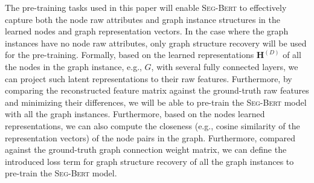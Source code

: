 \documentclass{article}
\newcommand{\mb}{\mathbf}
\newcommand{\our}{\textsc{Seg-Bert}}
\begin{document}
The pre-training tasks used in this paper will enable {\our} to effectively capture both the node raw attributes and graph instance structures in the learned nodes and graph representation vectors. In the case where the graph instances have no node raw attributes, only graph structure recovery will be used for the pre-training. Formally, based on the learned representations $\mb{H}^{(D)}$ of all the nodes in the graph instance, e.g., $G$, with several fully connected layers, we can project such latent representations to their raw features. Furthermore, by comparing the reconstructed feature matrix against the ground-truth raw features and minimizing their differences, we will be able to pre-train the {\our} model with all the graph instances. Furthermore, based on the nodes learned representations, we can also compute the closeness (e.g., cosine similarity of the representation vectors) of the node pairs in the graph. Furthermore, compared against the ground-truth graph connection weight matrix, we can define the introduced loss term for graph structure recovery of all the graph instances to pre-train the {\our} model.
\end{document}
